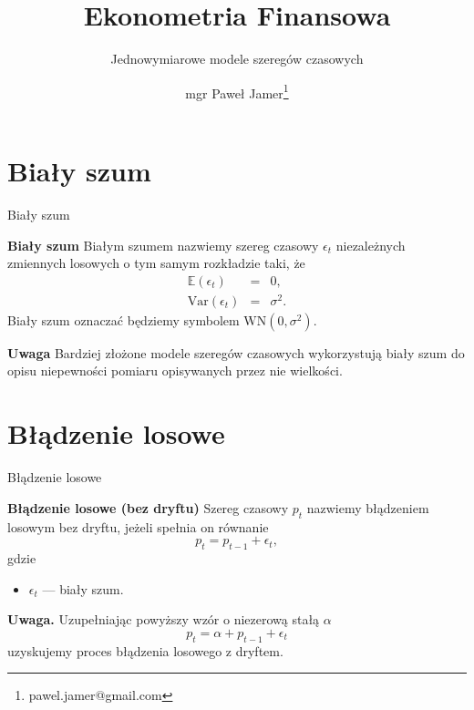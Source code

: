 \documentclass[a4paper, 11pt]{beamer}
\title{Ekonometria Finansowa}
\subtitle{Jednowymiarowe modele szeregów czasowych}
\author{mgr Paweł Jamer\thanks{pawel.jamer@gmail.com}}
\begin{document}
	\begin{frame}
		\titlepage
	\end{frame}
	
	\section{Biały szum}
	
	\begin{frame}{Biały szum}
		\begin{block}{\textbf{Biały szum}}
			Białym szumem nazwiemy szereg czasowy $\epsilon_t$ niezależnych zmiennych losowych o tym samym rozkładzie taki, że \begin{eqnarray*}
				\mathbb{E}\left(\epsilon_t\right) & = & 0,\\
				\mbox{Var}\left(\epsilon_t\right) & = & \sigma^2.
			\end{eqnarray*} Biały szum oznaczać będziemy symbolem $\mbox{WN}\left(0, \sigma^2\right)$.
		\end{block}
		\begin{alert}{\textbf{Uwaga}}
			Bardziej złożone modele szeregów czasowych wykorzystują biały szum do opisu niepewności pomiaru opisywanych przez nie wielkości.
		\end{alert}
	\end{frame}
	
	\section{Błądzenie losowe}
	
	\begin{frame}{Błądzenie losowe}
		\begin{block}{\textbf{Błądzenie losowe (bez dryftu)}}
			Szereg czasowy $p_t$ nazwiemy błądzeniem losowym bez dryftu, jeżeli spełnia on równanie \[
				p_t = p_{t-1} + \epsilon_t,
			\] gdzie
			\begin{itemize}
				\item $\epsilon_t$ --- biały szum.
			\end{itemize}
		\end{block}
		\begin{alert}{\textbf{Uwaga.}}
			Uzupełniając powyższy wzór o niezerową stałą $\alpha$ \[
				p_t = \alpha + p_{t-1} + \epsilon_t
			\] uzyskujemy proces błądzenia losowego z dryftem.
		\end{alert}
	\end{frame}
	
\end{document}
